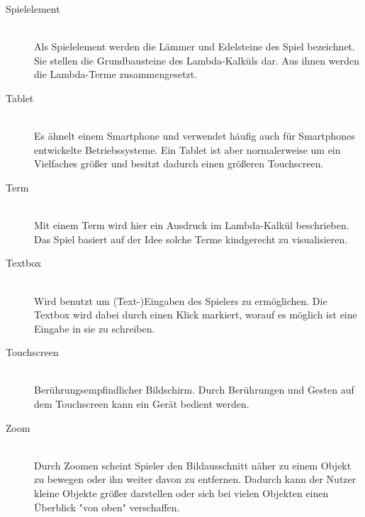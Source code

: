 \begin{description}
	\item[Spielelement] \hfill \\
	Als Spielelement werden die Lämmer und Edelsteine des Spiel bezeichnet. Sie stellen die Grundbausteine des Lambda-Kalküls dar.
	Aus ihnen werden die Lambda-Terme zusammengesetzt.
	
	\item[Tablet] \hfill \\
	Es ähnelt einem Smartphone und verwendet häufig auch für Smartphones entwickelte Betriebssysteme. 
	Ein Tablet ist aber normalerweise um ein Vielfaches größer und besitzt dadurch einen größeren Touchscreen.

	\item[Term] \hfill \\
	Mit einem Term wird hier ein Ausdruck im Lambda-Kalkül beschrieben. Das Spiel basiert auf der Idee solche Terme kindgerecht 
	zu visualisieren.
	
	\item[Textbox] \hfill \\
	Wird benutzt um (Text-)Eingaben des Spielers zu ermöglichen. Die Textbox wird dabei durch einen Klick markiert,
	worauf es möglich ist eine Eingabe in sie zu schreiben.
	
	\item[Touchscreen] \hfill \\
	Berührungsempfindlicher Bildschirm. Durch Berührungen und Gesten auf dem Touchscreen kann ein Gerät bedient werden.
	
	\item[Zoom] \hfill \\
	Durch Zoomen scheint Spieler den Bildausschnitt näher zu einem Objekt zu bewegen oder ihn weiter davon zu entfernen.
	Dadurch kann der Nutzer kleine Objekte größer darstellen oder sich bei vielen Objekten einen Überblick "von oben" verschaffen. 
\end{description}
